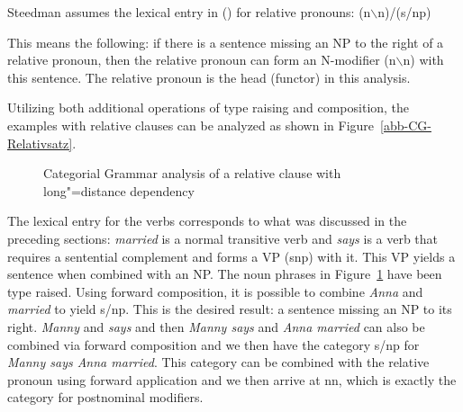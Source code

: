 Steedman assumes the lexical entry in () for relative pronouns:
\ea
\label{le-Relativpronomen-CG}
(n$\backslash$n)/(s/np)
\z

\noindent
This means the following: if there is a sentence missing an NP to the right of a relative pronoun, then the relative pronoun can form an
N-modifier (n$\backslash$n) with this sentence. The relative pronoun is the head (functor) in this analysis.

Utilizing both additional operations of type raising and composition, the examples with relative clauses can be analyzed as shown in
Figure~\vref{abb-CG-Relativsatz}.
%
\begin{figure}
\centerline{%
}
\caption{\label{abb-CG-Relativsatz}Categorial Grammar analysis of a relative clause with long"=distance dependency}
\end{figure}%
%
The lexical entry for the verbs corresponds to what was discussed in the preceding sections: \emph{married} is a normal transitive verb and 
 \emph{says} is a verb that requires a sentential complement and forms a VP (s\bs np) with it. This VP yields a sentence when combined
 with an NP. The noun phrases in Figure~\ref{abb-CG-Relativsatz} have been type raised. Using forward composition, it is possible to combine 
 \emph{Anna} and \emph{married} to yield s/np. This is the desired result: a sentence missing an NP to its right. \emph{Manny}
and \emph{says} and then \emph{Manny says} and \emph{Anna married} can also be combined via forward composition and we then have the category
s/np for \emph{Manny says Anna married}. This category can be combined with the relative pronoun using forward application and we then arrive at
n\bs n, which is exactly the category for postnominal modifiers.

